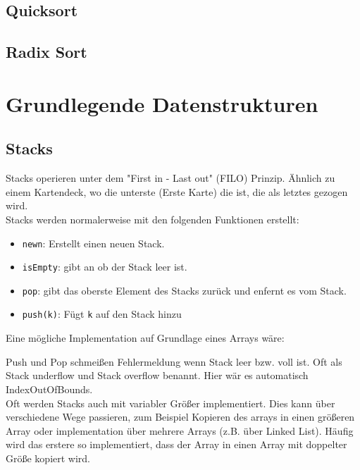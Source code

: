 \documentclass[ngerman,
color=3b,
load_common, %
boxarc,
main,
tikz,
border=3mm
]{article}
\begin{document}


\newpage
\subsection{Quicksort}



\newpage
\subsection{Radix Sort}



\newpage
\section{Grundlegende Datenstrukturen}
\subsection{Stacks}
Stacks operieren unter dem "First in - Last out" (FILO) Prinzip. Ähnlich zu einem Kartendeck, wo die unterste (Erste Karte) die ist, die als letztes gezogen wird. \\
Stacks werden normalerweise mit den folgenden Funktionen erstellt:
\begin{itemize}
    \item \texttt{new{n}}: Erstellt einen neuen Stack.
    \item \texttt{isEmpty}: gibt an ob der Stack leer ist.
    \item \texttt{pop}: gibt das oberste Element des Stacks zurück und enfernt es vom Stack.
    \item \texttt{push(k)}: Fügt \texttt{k} auf den Stack hinzu
\end{itemize}
Eine mögliche Implementation auf Grundlage eines Arrays wäre:


Push und Pop schmeißen Fehlermeldung wenn Stack leer bzw. voll ist. Oft als Stack underflow und Stack overflow benannt. Hier wär es automatisch IndexOutOfBounds.\\ Oft werden Stacks auch mit variabler Größer implementiert. Dies kann über verschiedene Wege passieren, zum Beispiel Kopieren des arrays in einen größeren Array oder implementation über mehrere Arrays (z.B. über Linked List). Häufig wird das erstere so implementiert, dass der Array in einen Array mit doppelter Größe kopiert wird.
\end{document}
